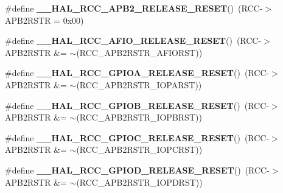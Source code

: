 \begin{DoxyCompactItemize}
\item 
\mbox{\label{group___r_c_c___a_p_b2___force___release___reset_gae1e413d623154942d5bbe89769161ece}} 
\#define {\bfseries \+\_\+\+\_\+\+H\+A\+L\+\_\+\+R\+C\+C\+\_\+\+A\+P\+B2\+\_\+\+R\+E\+L\+E\+A\+S\+E\+\_\+\+R\+E\+S\+ET}()~(R\+CC-\/$>$A\+P\+B2\+R\+S\+TR = 0x00)
\item 
\mbox{\label{group___r_c_c___a_p_b2___force___release___reset_ga7b8441a89288e723bf87077b358ec224}} 
\#define {\bfseries \+\_\+\+\_\+\+H\+A\+L\+\_\+\+R\+C\+C\+\_\+\+A\+F\+I\+O\+\_\+\+R\+E\+L\+E\+A\+S\+E\+\_\+\+R\+E\+S\+ET}()~(R\+CC-\/$>$A\+P\+B2\+R\+S\+TR \&= $\sim$(R\+C\+C\+\_\+\+A\+P\+B2\+R\+S\+T\+R\+\_\+\+A\+F\+I\+O\+R\+ST))
\item 
\mbox{\label{group___r_c_c___a_p_b2___force___release___reset_gad56e47c2eacd972491f94296053d0cc3}} 
\#define {\bfseries \+\_\+\+\_\+\+H\+A\+L\+\_\+\+R\+C\+C\+\_\+\+G\+P\+I\+O\+A\+\_\+\+R\+E\+L\+E\+A\+S\+E\+\_\+\+R\+E\+S\+ET}()~(R\+CC-\/$>$A\+P\+B2\+R\+S\+TR \&= $\sim$(R\+C\+C\+\_\+\+A\+P\+B2\+R\+S\+T\+R\+\_\+\+I\+O\+P\+A\+R\+ST))
\item 
\mbox{\label{group___r_c_c___a_p_b2___force___release___reset_gaf03da3b36478071844fbd77df618a686}} 
\#define {\bfseries \+\_\+\+\_\+\+H\+A\+L\+\_\+\+R\+C\+C\+\_\+\+G\+P\+I\+O\+B\+\_\+\+R\+E\+L\+E\+A\+S\+E\+\_\+\+R\+E\+S\+ET}()~(R\+CC-\/$>$A\+P\+B2\+R\+S\+TR \&= $\sim$(R\+C\+C\+\_\+\+A\+P\+B2\+R\+S\+T\+R\+\_\+\+I\+O\+P\+B\+R\+ST))
\item 
\mbox{\label{group___r_c_c___a_p_b2___force___release___reset_ga1df0e3536d3450435bdccdbe9c878736}} 
\#define {\bfseries \+\_\+\+\_\+\+H\+A\+L\+\_\+\+R\+C\+C\+\_\+\+G\+P\+I\+O\+C\+\_\+\+R\+E\+L\+E\+A\+S\+E\+\_\+\+R\+E\+S\+ET}()~(R\+CC-\/$>$A\+P\+B2\+R\+S\+TR \&= $\sim$(R\+C\+C\+\_\+\+A\+P\+B2\+R\+S\+T\+R\+\_\+\+I\+O\+P\+C\+R\+ST))
\item 
\mbox{\label{group___r_c_c___a_p_b2___force___release___reset_ga29fbf71f71ea27ffa38e7283b6dce03d}} 
\#define {\bfseries \+\_\+\+\_\+\+H\+A\+L\+\_\+\+R\+C\+C\+\_\+\+G\+P\+I\+O\+D\+\_\+\+R\+E\+L\+E\+A\+S\+E\+\_\+\+R\+E\+S\+ET}()~(R\+CC-\/$>$A\+P\+B2\+R\+S\+TR \&= $\sim$(R\+C\+C\+\_\+\+A\+P\+B2\+R\+S\+T\+R\+\_\+\+I\+O\+P\+D\+R\+ST))

\end{DoxyCompactItemize}
